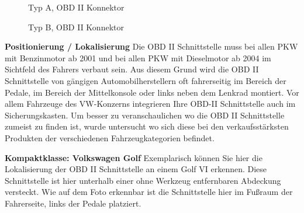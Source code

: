 \begin{figure}[!htb]\centering
   \begin{minipage}{0.49\textwidth}
     \caption{Typ A, OBD II Konnektor \cite{SIMR.CH2-obd2.OBDIITypeA}}\label{Fig:Data1}
   \end{minipage}
   \begin {minipage}{0.49\textwidth}
     \caption{Typ B, OBD II Konnektor \cite{SIMR.CH2-obd2.OBDIITypeB}}\label{Fig:Data2}
   \end{minipage}
\end{figure}


\textbf{Positionierung / Lokalisierung\nextline}
Die OBD II Schnittstelle muss bei allen PKW mit Benzinmotor ab 2001 und bei allen PKW mit Dieselmotor ab 2004 im Sichtfeld des Fahrers verbaut sein. Aus diesem Grund wird die OBD II Schnittstelle von gängigen Automobilherstellern oft fahrerseitig im Bereich der Pedale, im Bereich der Mittelkonsole oder links neben dem Lenkrad montiert. Vor allem Fahrzeuge des VW-Konzerns integrieren Ihre OBD-II Schnittstelle auch im Sicherungskasten. Um besser zu veranschaulichen wo die OBD II Schnittstelle zumeist zu finden ist, wurde untersucht wo sich diese bei den verkaufsstärksten Produkten der verschiedenen Fahrzeugkategorien befindet.

\textbf{Kompaktklasse: Volkswagen Golf}
Exemplarisch können Sie hier die Lokalisierung der OBD II Schnittstelle an einem Golf VI erkennen. Diese Schnittstelle ist hier unterhalb einer ohne Werkzeug entfernbaren Abdeckung versteckt. Wie auf dem Foto erkennbar ist die Schnittstelle hier im Fußraum der Fahrerseite, links der Pedale platziert.

